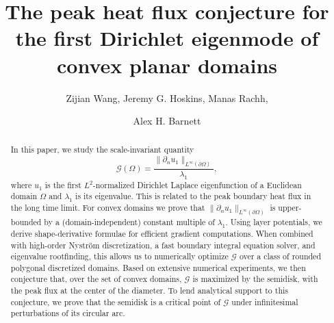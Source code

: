 \documentclass{amsart}
\title[Peak heat flux conjecture]{The peak heat flux conjecture
  for the first Dirichlet eigenmode of convex planar domains}
\author[ZW, JH, MR, \and AB]{Zijian Wang, Jeremy G. Hoskins, Manas Rachh, \and Alex H. Barnett}
\theoremstyle{plain}
\begin{document}
\begin{abstract}
In this paper, we study the scale-invariant quantity
    \[\mathcal{G}(\Omega)=\frac{\|\partial_n u_1\|_{L^\infty(\partial\Omega)}}{\lambda_1},\]
    where $u_1$ is the first $L^2$-normalized Dirichlet Laplace eigenfunction of a Euclidean domain $\Omega$ and $\lambda_1$ is its eigenvalue.
    This is related to the peak boundary heat flux in the long time limit.
    For convex domains   %
    we prove that
    $\|\partial_n u_1\|_{L^\infty(\partial\Omega)}$ is upper-bounded by a (domain-independent) constant multiple of $\lambda_1$.
Using layer potentials, we derive shape-derivative formulae for efficient gradient computations.
When combined with high-order Nystr\"om discretization, a fast boundary integral equation solver, and eigenvalue rootfinding, this
allows us to numerically optimize $\mathcal{G}$ over a class of rounded polygonal discretized domains.
Based on extensive numerical experiments, we then conjecture that, over the set of convex domains, $\mathcal{G}$ is maximized by the semidisk, with the peak flux at
the center of the diameter.
To lend analytical support to this conjecture, we prove that the semidisk is a critical point of $\mathcal{G}$ under infinitesimal perturbations of its circular arc.
\end{abstract}
\maketitle
\end{document}
